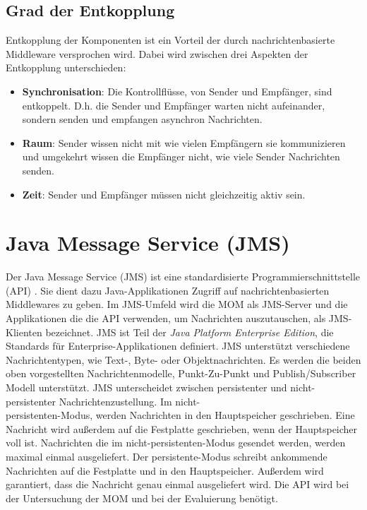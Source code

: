 \subsection{Grad der Entkopplung}
Entkopplung der Komponenten ist ein Vorteil der durch nachrichtenbasierte Middleware versprochen wird. Dabei wird zwischen drei Aspekten der Entkopplung \cite{Eugster03} unterschieden:
\begin{itemize}
    \item \textbf{Synchronisation}: Die Kontrollflüsse, von Sender und Empfänger, sind entkoppelt. D.h. die Sender und Empfänger warten nicht aufeinander, sondern senden und empfangen asynchron Nachrichten.
    \item \textbf{Raum}: Sender wissen nicht mit wie vielen Empfängern sie kommunizieren und umgekehrt wissen die Empfänger nicht, wie viele Sender Nachrichten senden.
    \item \textbf{Zeit}: Sender und Empfänger müssen nicht gleichzeitig aktiv sein.
\end{itemize}

\section{Java Message Service (JMS)}
Der Java Message Service (JMS) ist eine standardisierte Programmierschnittstelle (API) \cite{jmsspec}. Sie dient dazu Java-Applikationen Zugriff auf nachrichtenbasierten Middlewares zu geben. Im JMS-Umfeld wird die MOM als JMS-Server und die Applikationen die die API verwenden, um Nachrichten auszutauschen, als JMS-Klienten bezeichnet. JMS ist Teil der \emph{Java Platform Enterprise Edition}, die Standards für Enterprise-Applikationen definiert. JMS unterstützt verschiedene Nachrichtentypen, wie Text-, Byte- oder Objektnachrichten. Es werden die beiden oben vorgestellten Nachrichtenmodelle, Punkt-Zu-Punkt und Publish/Subscriber Modell unterstützt. JMS unterscheidet zwischen persistenter und nicht-persistenter Nachrichtenzustellung. Im nicht-\\persistenten-Modus, werden Nachrichten in den Hauptspeicher geschrieben. Eine Nachricht wird außerdem auf die Festplatte geschrieben, wenn der Hauptspeicher voll ist. Nachrichten die im nicht-persistenten-Modus gesendet werden, werden maximal einmal ausgeliefert. Der persistente-Modus schreibt ankommende Nachrichten auf die Festplatte und in den Hauptspeicher. Außerdem wird garantiert, dass die Nachricht genau einmal ausgeliefert wird. 
Die API wird bei der Untersuchung der MOM und bei der Evaluierung benötigt.

